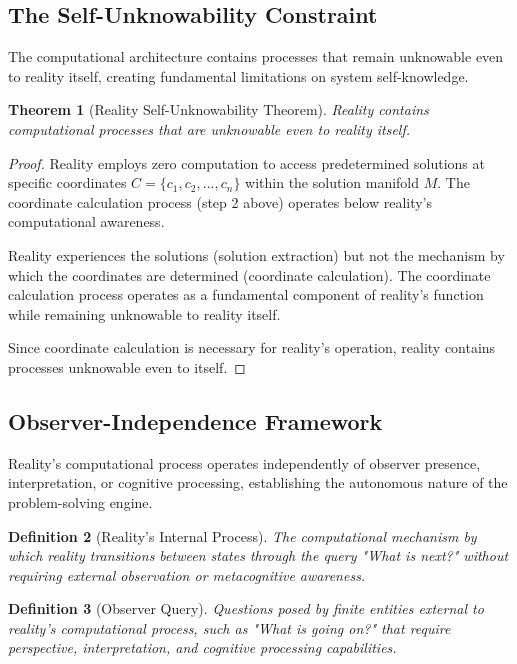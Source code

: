 \documentclass[12pt,a4paper]{article}
\newtheorem{theorem}{Theorem}[section]
\newtheorem{definition}[theorem]{Definition}
\begin{document}
\subsection{The Self-Unknowability Constraint}

The computational architecture contains processes that remain unknowable even to reality itself, creating fundamental limitations on system self-knowledge.

\begin{theorem}[Reality Self-Unknowability Theorem]
Reality contains computational processes that are unknowable even to reality itself.
\end{theorem}

\begin{proof}
Reality employs zero computation to access predetermined solutions at specific coordinates $C = \{c_1, c_2, ..., c_n\}$ within the solution manifold $M$. The coordinate calculation process (step 2 above) operates below reality's computational awareness.

Reality experiences the solutions (solution extraction) but not the mechanism by which the coordinates are determined (coordinate calculation). The coordinate calculation process operates as a fundamental component of reality's function while remaining unknowable to reality itself.

Since coordinate calculation is necessary for reality's operation, reality contains processes unknowable even to itself.
\end{proof}

\subsection{Observer-Independence Framework}

Reality's computational process operates independently of observer presence, interpretation, or cognitive processing, establishing the autonomous nature of the problem-solving engine.

\begin{definition}[Reality's Internal Process]
The computational mechanism by which reality transitions between states through the query "What is next?" without requiring external observation or metacognitive awareness.
\end{definition}

\begin{definition}[Observer Query]
Questions posed by finite entities external to reality's computational process, such as "What is going on?" that require perspective, interpretation, and cognitive processing capabilities.
\end{definition}
\end{document}
